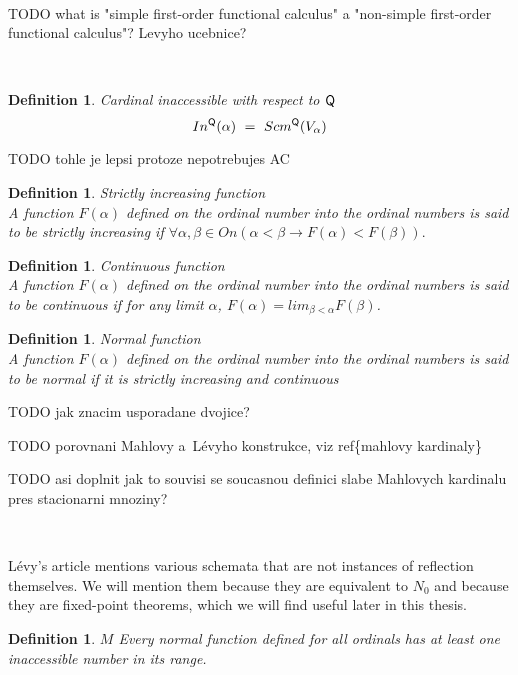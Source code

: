 \documentclass[12pt,a4paper]{article}
\newtheorem{definition}[theorem]{Definition}
\newcommand{\then}{\rightarrow}
\begin{document}
\

TODO what is "simple first-order functional calculus" a "non-simple first-order functional calculus"? Levyho ucebnice?

\

\begin{definition}{Cardinal inaccessible with respect to $\sf{Q}$}\label{def:levy_inaccessible}
\begin{equation}
In^{\sf{Q}}(\alpha)\ =\ Scm^{\sf{Q}}(V_\alpha)
\end{equation}
\end{definition}

TODO tohle je lepsi protoze nepotrebujes AC


\begin{definition}{Strictly increasing function}\\
A function $F(\alpha)$ defined on the ordinal number into the ordinal numbers is said to be \emph{strictly increasing} if
$\forall \alpha, \beta \in On (\alpha < \beta \then F(\alpha) < F(\beta)).$
\end{definition}

\begin{definition}{Continuous function}\\
A function $F(\alpha)$ defined on the ordinal number into the ordinal numbers is said to be \emph{continuous} if
for any limit $\alpha$, $F(\alpha) = lim_{\beta < \alpha} F(\beta)$.
\end{definition}

\begin{definition}{Normal function}\\
A function $F(\alpha)$ defined on the ordinal number into the ordinal numbers is said to be \emph{normal} if it is \emph{strictly increasing} and \emph{continuous}
\end{definition}

TODO jak znacim usporadane dvojice?

TODO porovnani Mahlovy a~Lévyho konstrukce, viz ref\{mahlovy kardinaly\}

TODO asi doplnit jak to souvisi se soucasnou definici slabe Mahlovych kardinalu pres stacionarni mnoziny?

\

Lévy's article mentions various schemata that are not instances of reflection themselves. We will mention them because they are equivalent to $N_0$ and because they are fixed-point theorems, which we will find useful later in this thesis.

\begin{definition}{$M$}
Every normal function defined for all ordinals has at least one inaccessible number in its range.
\end{definition}
\end{document}
